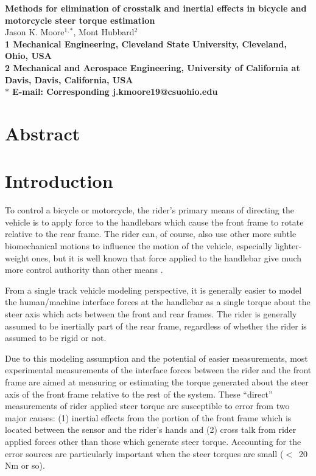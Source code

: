 \documentclass[10pt]{article}
\date{}
\begin{document}
\begin{flushleft}
  {\Large
  \textbf{Methods for elimination of crosstalk and inertial effects in bicycle and
  motorcycle steer torque estimation}
  }
  \\
  Jason K. Moore$^{1,\ast}$,
  Mont Hubbard$^{2}$
  \\
  \bf{1} Mechanical Engineering, Cleveland State University, Cleveland, Ohio, USA
  \\
  \bf{2} Mechanical and Aerospace Engineering, University of California at Davis, Davis, California, USA
  \\
  $\ast$ E-mail: Corresponding j.kmoore19@csuohio.edu
\end{flushleft}

\section*{Abstract}

\section*{Introduction}

To control a bicycle or motorcycle, the rider's primary means of directing the
vehicle is to apply force to the handlebars which cause the front frame to
rotate relative to the rear frame. The rider can, of course, also use other
more subtle biomechanical motions to influence the motion of the vehicle,
especially lighter-weight ones, but it is well known that force applied to the
handlebar give much more control authority than other means
\cite{Sharp2007,Sharp2008a}. %

From a single track vehicle modeling perspective, it is generally easier to
model the human/machine interface forces at the handlebar as a single torque
about the steer axis which acts between the front and rear frames. The rider is
generally assumed to be inertially part of the rear frame, regardless of
whether the rider is assumed to be rigid or not.

Due to this modeling assumption and the potential of easier measurements, most
experimental measurements of the interface forces between the rider and the
front frame are aimed at measuring or estimating the torque generated about the
steer axis of the front frame relative to the rest of the system. These
``direct'' measurements of rider applied steer torque are susceptible to error
from two major causes: (1) inertial effects from the portion of the front frame
which is located between the sensor and the rider's hands and (2) cross talk
from rider applied forces other than those which generate steer torque.
Accounting for the error sources are particularly important when the steer
torques are small ($<$~20 Nm or so).
\end{document}
